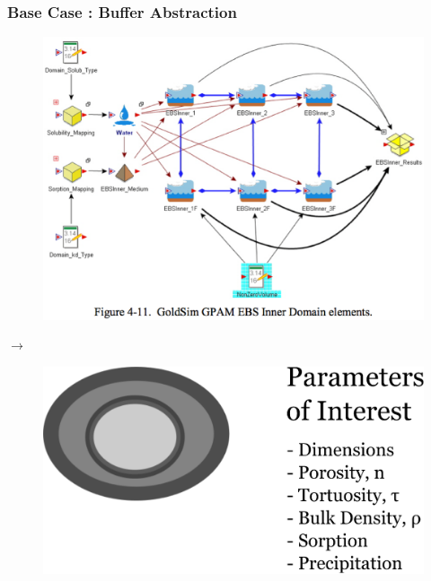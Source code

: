 \begin{frame}[ctb!]
  \frametitle{Base Case : Buffer Abstraction}
  \begin{minipage}{0.45\textwidth}
    \begin{figure}[h!]
      \begin{center}
        \includegraphics[width=\textwidth]{./images/buffer.eps}
      \end{center}
    \end{figure}
  \end{minipage}
  \hspace{0.01cm}\large{$\rightarrow$}\hspace{0.01cm}
  \begin{minipage}{0.45\textwidth}
    \begin{figure}[h!]
      \begin{center}
        \includegraphics[width=\textwidth]{./images/abstractionBuffer.eps}
      \end{center}
    \end{figure}
  \end{minipage}
\end{frame}

